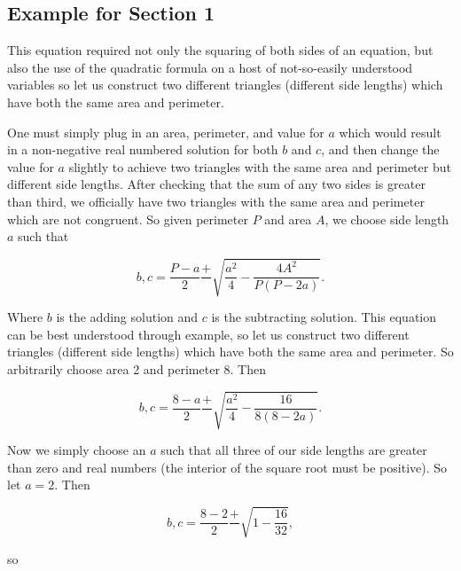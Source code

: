 \documentclass[12pt]{report}
\numberwithin{definition}{section}
\begin{document}
\break



\subsection{Example for Section 1}
This equation required not only the squaring of both sides of an equation, but also the use of the quadratic formula on a host of not-so-easily understood variables so let us construct two different triangles (different side lengths) which have both the same area and perimeter. 




  


	 One must simply plug in an area, perimeter, and value for $a$ which would result in a non-negative real numbered solution for both $b$ and $c$, and then change the value for $a$ slightly to achieve two triangles with the same area and perimeter but different side lengths. After checking that the sum of any two sides is greater than third, we officially have two triangles with the same area and perimeter which are not congruent. So given perimeter $P$ and area $A$, we choose side length $a$ such that 

  

\[
b, c=  \frac{P-a}{2}\frac{+}{}\sqrt{\frac{a^2}{4}-\frac{4A^2}{P(P-2a)}}.
\]



  



Where $b$ is the adding solution and $c$ is the subtracting solution. This equation can be best understood through example, so let us construct two different triangles (different side lengths) which have both the same area and perimeter. So arbitrarily choose area 2 and perimeter 8. Then 


  


\[b, c=  \frac{8-a}{2}\frac{+}{}\sqrt{\frac{a^2}{4}-\frac{16}{8(8-2a)}}.\]

  


Now we simply choose an $a$ such that all three of our side lengths are greater than zero and real numbers (the interior of the square root must be positive). So let $a = 2$. Then 

  


\[b, c=  \frac{8-2}{2}\frac{+}{}\sqrt{1-\frac{16}{32}},\]

  


so 
\end{document}
